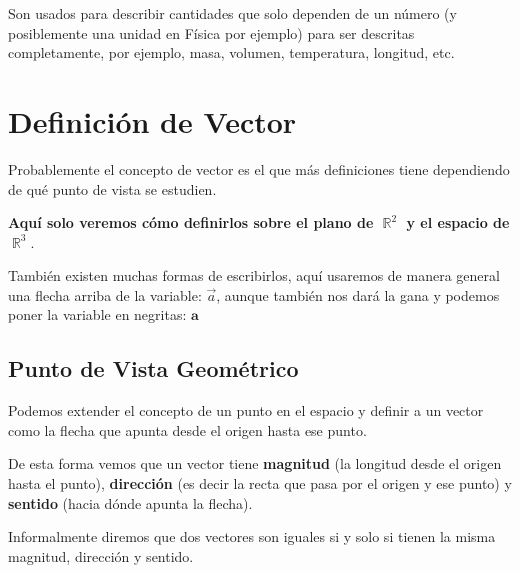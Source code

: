 \documentclass[12pt, fleqn]{report}                             %
\theoremstyle{break}                                            %
\DeclareMathOperator \Reals        {\mathbb{R}}                 %
\newcommand{\bVec}[1]{\mathbf{#1}}                              %
\begin{document}
            Son usados para describir cantidades que solo dependen de un número (y posiblemente una
            unidad en Física por ejemplo) para ser descritas completamente, por ejemplo, masa,
            volumen, temperatura, longitud, etc.


        \vspace{1em}
        \section{Definición de Vector}
        
            Probablemente el concepto de vector es el que más definiciones tiene dependiendo de qué
            punto de vista se estudien.

            \textbf{Aquí solo veremos cómo definirlos sobre el plano de $\Reals^2$ y el espacio de $\Reals^3$}.

            También existen muchas formas de escribirlos, aquí usaremos de manera general una flecha
            arriba de la variable: $\vec{a}$, aunque también nos dará la gana y podemos poner la
            variable en negritas: $\bVec{a}$

            \subsection{Punto de Vista Geométrico}
            
                Podemos extender el concepto de un punto en el espacio y definir a un vector
                como la flecha que apunta desde el origen hasta ese punto.

                De esta forma vemos que un vector tiene \textbf{magnitud} (la longitud desde
                el origen hasta el punto), \textbf{dirección} (es decir la recta que pasa por
                el origen y ese punto) y \textbf{sentido} (hacia dónde apunta la flecha).
                
                Informalmente diremos que dos vectores son iguales si y solo si tienen la misma
                magnitud, dirección y sentido.
                
\end{document}
